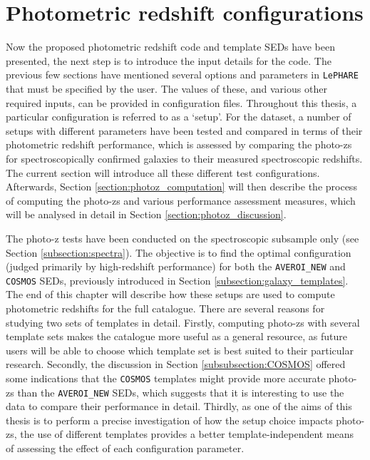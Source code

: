 \section{Photometric redshift configurations}\label{section:setups}
Now the proposed photometric redshift code and template SEDs have been presented, the next step is to introduce the input details for the code. The previous few sections have mentioned several options and parameters in \texttt{LePHARE} that must be specified by the user. The values of these, and various other required inputs, can be provided in configuration files. Throughout this thesis, a particular configuration is referred to as a `setup'. For the \DESVIDEO dataset, a number of setups with different parameters have been tested and compared in terms of their photometric redshift performance, which is assessed by comparing the photo-zs for spectroscopically confirmed galaxies to their measured spectroscopic redshifts. The current section will introduce all these different test configurations.  Afterwards, Section \ref{section:photoz_computation} will then describe the process of computing the photo-zs and various performance assessment measures, which will be analysed in detail in Section \ref{section:photoz_discussion}. \par

 
The photo-z tests have been conducted on the spectroscopic \DESVIDEO subsample only (see Section \ref{subsection:spectra}). The objective is to find the optimal configuration (judged primarily by high-redshift performance) for both the \texttt{AVEROI\_NEW} and \texttt{COSMOS} SEDs, previously introduced in Section \ref{subsection:galaxy_templates}.  The end of this chapter will describe how these setups are used to compute photometric redshifts for the full \DESVIDEO catalogue. There are several reasons for studying two sets of templates in detail. Firstly, computing photo-zs with several template sets makes the \DESVIDEO catalogue more useful as a general resource, as future users will be able to choose which template set is best suited to their particular research. Secondly, the discussion in Section \ref{subsubsection:COSMOS} offered some indications that the \texttt{COSMOS} templates might provide more accurate photo-zs than the \texttt{AVEROI\_NEW} SEDs, which suggests that it is interesting to use the \DESVIDEO data to compare their performance in detail. Thirdly, as one of the aims of this thesis is to perform a precise investigation of how the setup choice impacts photo-zs, the use of different templates provides a better template-independent means of assessing the effect of each configuration parameter.\par


